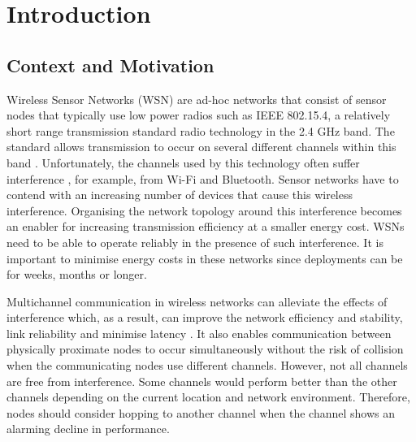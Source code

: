 \chapter{Introduction}
\label{introduction}

\section{Context and Motivation}
Wireless Sensor Networks (WSN) are ad-hoc networks that consist of sensor nodes that typically use low power radios such as IEEE 802.15.4, a relatively short range transmission standard radio technology in the 2.4 GHz band. The standard allows transmission to occur on several different channels within this band \cite{ieee802.15.4}. Unfortunately, the channels used by this technology often suffer interference \cite{interferenceModel, ieeeCompare}, for example, from Wi-Fi \cite{ieee_2012, wu} and Bluetooth. Sensor networks have to contend with an increasing number of devices that cause this wireless interference. Organising the network topology around this interference becomes an enabler for increasing transmission efficiency at a smaller energy cost. WSNs need to be able to operate reliably in the presence of such interference. It is important to minimise energy costs in these networks since deployments can be for weeks, months or longer.

Multichannel communication in wireless networks can alleviate the effects of interference which, as a result, can improve the network efficiency and stability, link reliability and minimise latency \cite{watteyne}. It also enables communication between physically proximate nodes to occur simultaneously without the risk of collision when the communicating nodes use different channels. However, not all channels are free from interference. Some channels would perform better than the other channels depending on the current location and network environment. Therefore, nodes should consider hopping to another channel when the channel shows an alarming decline in performance.

